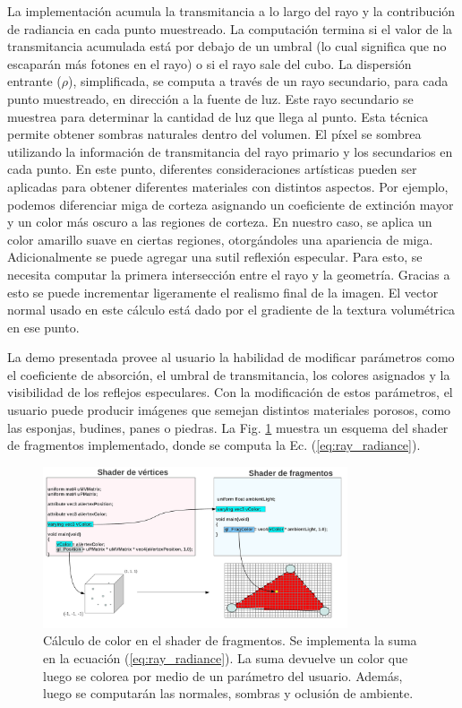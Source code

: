 La implementación acumula la transmitancia a lo largo del rayo y la contribución de radiancia en cada punto muestreado.
La computación termina si el valor de la transmitancia acumulada está por debajo de un umbral (lo cual significa que no escaparán más fotones en el rayo) o si el rayo sale del cubo.
La dispersión entrante ($\rho$), simplificada, se computa a través de un rayo secundario, para cada punto muestreado, en dirección a la fuente de luz.
Este rayo secundario se muestrea para determinar la cantidad de luz que llega al punto.
Esta técnica permite obtener sombras naturales dentro del volumen.
El píxel se sombrea utilizando la información de transmitancia del rayo primario y los secundarios en cada punto.
En este punto, diferentes consideraciones artísticas pueden ser aplicadas para obtener diferentes materiales con distintos aspectos.
Por ejemplo, podemos diferenciar miga de corteza asignando un coeficiente de extinción mayor y un color más oscuro a las regiones de corteza.
En nuestro caso, se aplica un color amarillo suave en ciertas regiones, otorgándoles una apariencia de miga.
Adicionalmente se puede agregar una sutil reflexión especular.
Para esto, se necesita computar la primera intersección entre el rayo y la geometría.
Gracias a esto se puede incrementar ligeramente el realismo final de la imagen.
El vector normal usado en este cálculo está dado por el gradiente de la textura volumétrica en ese punto.

La demo presentada provee al usuario la habilidad de modificar parámetros como el coeficiente de absorción, el umbral de transmitancia, los colores asignados y la visibilidad de los reflejos especulares.
Con la modificación de estos parámetros, el usuario puede producir imágenes que semejan distintos materiales porosos, como las esponjas, budines, panes o piedras.
La Fig. \ref{fg:fragmentshaderrte} muestra un esquema del shader de fragmentos implementado, donde se computa la Ec. (\ref{eq:ray_radiance}).

\begin{figure}[htb!]
\centerline{\includegraphics[width=9cm]{figures/fragmentshader}}
\caption[Cálculo de color en el shader de fragmentos]{Cálculo de color en el shader de fragmentos. Se implementa la suma en la ecuación (\ref{eq:ray_radiance}). La suma devuelve un color que luego se colorea por medio de un parámetro del usuario. Además, luego se computarán las normales, sombras y oclusión de ambiente.}
\label{fg:fragmentshaderrte}
\end{figure}


